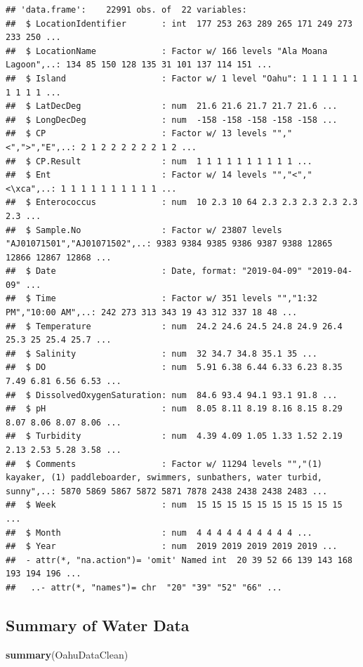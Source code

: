 \documentclass[12pt,]{article}
\newenvironment{Shaded}{\begin{snugshade}}{\end{snugshade}}
\newcommand{\KeywordTok}[1]{\textcolor[rgb]{0.13,0.29,0.53}{\textbf{#1}}}
\newcommand{\NormalTok}[1]{#1}
\begin{document}
\begin{verbatim}
## 'data.frame':    22991 obs. of  22 variables:
##  $ LocationIdentifier       : int  177 253 263 289 265 171 249 273 233 250 ...
##  $ LocationName             : Factor w/ 166 levels "Ala Moana Lagoon",..: 134 85 150 128 135 31 101 137 114 151 ...
##  $ Island                   : Factor w/ 1 level "Oahu": 1 1 1 1 1 1 1 1 1 1 ...
##  $ LatDecDeg                : num  21.6 21.6 21.7 21.7 21.6 ...
##  $ LongDecDeg               : num  -158 -158 -158 -158 -158 ...
##  $ CP                       : Factor w/ 13 levels "","<",">","E",..: 2 1 2 2 2 2 2 2 1 2 ...
##  $ CP.Result                : num  1 1 1 1 1 1 1 1 1 1 ...
##  $ Ent                      : Factor w/ 14 levels "","<","<\xca",..: 1 1 1 1 1 1 1 1 1 1 ...
##  $ Enterococcus             : num  10 2.3 10 64 2.3 2.3 2.3 2.3 2.3 2.3 ...
##  $ Sample.No                : Factor w/ 23807 levels "AJ01071501","AJ01071502",..: 9383 9384 9385 9386 9387 9388 12865 12866 12867 12868 ...
##  $ Date                     : Date, format: "2019-04-09" "2019-04-09" ...
##  $ Time                     : Factor w/ 351 levels "","1:32 PM","10:00 AM",..: 242 273 313 343 19 43 312 337 18 48 ...
##  $ Temperature              : num  24.2 24.6 24.5 24.8 24.9 26.4 25.3 25 25.4 25.7 ...
##  $ Salinity                 : num  32 34.7 34.8 35.1 35 ...
##  $ DO                       : num  5.91 6.38 6.44 6.33 6.23 8.35 7.49 6.81 6.56 6.53 ...
##  $ DissolvedOxygenSaturation: num  84.6 93.4 94.1 93.1 91.8 ...
##  $ pH                       : num  8.05 8.11 8.19 8.16 8.15 8.29 8.07 8.06 8.07 8.06 ...
##  $ Turbidity                : num  4.39 4.09 1.05 1.33 1.52 2.19 2.13 2.53 5.28 3.58 ...
##  $ Comments                 : Factor w/ 11294 levels "","(1) kayaker, (1) paddleboarder, swimmers, sunbathers, water turbid, sunny",..: 5870 5869 5867 5872 5871 7878 2438 2438 2438 2483 ...
##  $ Week                     : num  15 15 15 15 15 15 15 15 15 15 ...
##  $ Month                    : num  4 4 4 4 4 4 4 4 4 4 ...
##  $ Year                     : num  2019 2019 2019 2019 2019 ...
##  - attr(*, "na.action")= 'omit' Named int  20 39 52 66 139 143 168 193 194 196 ...
##   ..- attr(*, "names")= chr  "20" "39" "52" "66" ...
\end{verbatim}

\subsection{Summary of Water Data}\label{summary-of-water-data}

\begin{Shaded}
\begin{Highlighting}[]
\KeywordTok{summary}\NormalTok{(OahuDataClean)}
\end{Highlighting}
\end{Shaded}
\end{document}
